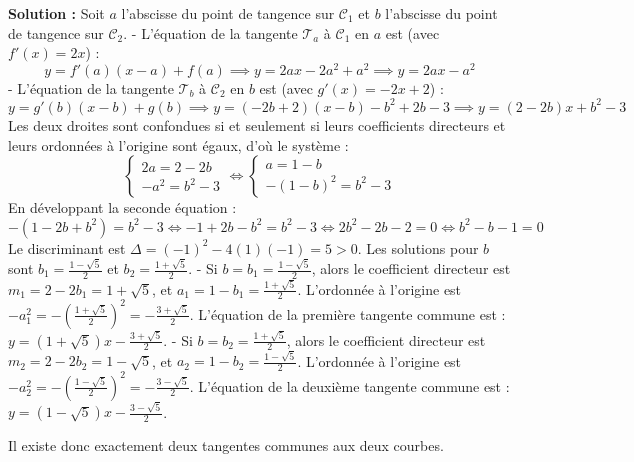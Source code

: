 \textbf{Solution :}
Soit $a$ l'abscisse du point de tangence sur $\mathcal{C}_1$ et $b$ l'abscisse du point de tangence sur $\mathcal{C}_2$.
- L'équation de la tangente $\mathcal{T}_a$ à $\mathcal{C}_1$ en $a$ est (avec $f'(x) = 2x$) :
  \[
  y = f'(a)(x-a) + f(a) \implies y = 2ax - 2a^2 + a^2 \implies y = 2ax - a^2
  \]
- L'équation de la tangente $\mathcal{T}_b$ à $\mathcal{C}_2$ en $b$ est (avec $g'(x) = -2x+2$) :
  \[
  y = g'(b)(x-b) + g(b) \implies y = (-2b+2)(x-b) - b^2 + 2b - 3 \implies y = (2-2b)x + b^2 - 3
  \]
Les deux droites sont confondues si et seulement si leurs coefficients directeurs et leurs ordonnées à l'origine sont égaux, d'où le système :
\[
\begin{cases}
2a = 2 - 2b \\
-a^2 = b^2 - 3
\end{cases} \iff 
\begin{cases}
a = 1 - b \\
-(1 - b)^2 = b^2 - 3
\end{cases}
\]
En développant la seconde équation :
\[
-(1 - 2b + b^2) = b^2 - 3 \iff -1 + 2b - b^2 = b^2 - 3 \iff 2b^2 - 2b - 2 = 0 \iff b^2 - b - 1 = 0
\]
Le discriminant est $\Delta = (-1)^2 - 4(1)(-1) = 5 > 0$.
Les solutions pour $b$ sont $b_1 = \frac{1-\sqrt{5}}{2}$ et $b_2 = \frac{1+\sqrt{5}}{2}$.
- Si $b = b_1 = \frac{1-\sqrt{5}}{2}$, alors le coefficient directeur est $m_1 = 2-2b_1 = 1+\sqrt{5}$, et $a_1 = 1-b_1 = \frac{1+\sqrt{5}}{2}$.
  L'ordonnée à l'origine est $-a_1^2 = -\left(\frac{1+\sqrt{5}}{2}\right)^2 = -\frac{3+\sqrt{5}}{2}$.
  L'équation de la première tangente commune est : $y = (1+\sqrt{5})x - \frac{3+\sqrt{5}}{2}$.
- Si $b = b_2 = \frac{1+\sqrt{5}}{2}$, alors le coefficient directeur est $m_2 = 2-2b_2 = 1-\sqrt{5}$, et $a_2 = 1-b_2 = \frac{1-\sqrt{5}}{2}$.
  L'ordonnée à l'origine est $-a_2^2 = -\left(\frac{1-\sqrt{5}}{2}\right)^2 = -\frac{3-\sqrt{5}}{2}$.
  L'équation de la deuxième tangente commune est : $y = (1-\sqrt{5})x - \frac{3-\sqrt{5}}{2}$.

Il existe donc exactement deux tangentes communes aux deux courbes.


